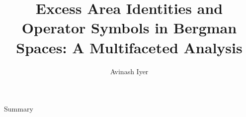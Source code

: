 \documentclass{reu_beamer}
\title[]{Excess Area Identities and Operator Symbols in Bergman Spaces: A Multifaceted Analysis}
\author{
    Avinash Iyer
}
\institute{Occidental College}
\date{}
\begin{document}
\begin{frame}
    \begin{figure}[h]
        \centering
    \end{figure}
    \maketitle
\end{frame}
\begin{frame}{Summary}
\tableofcontents
\end{frame}
\end{document}
